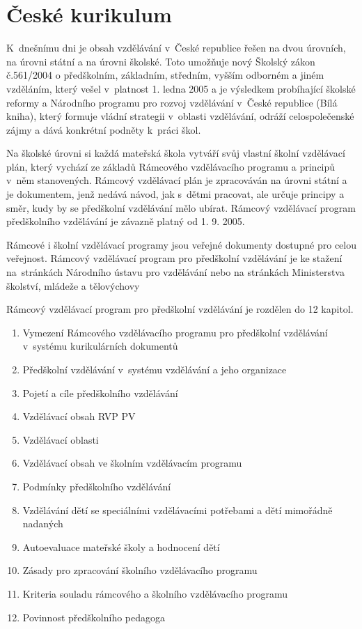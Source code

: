 	\section{České kurikulum}

		K dnešnímu dni je obsah vzdělávání v České republice řešen na dvou úrovních, na úrovni státní a na úrovni školské. Toto umožňuje nový Školský zákon č.561/2004 o předškolním, základním, středním, vyšším odborném a jiném vzděláním, který vešel v platnost 1. ledna 2005 a je výsledkem probíhající školské reformy a Národního programu pro rozvoj vzdělávání v České republice (Bílá kniha), který formuje vládní strategii v oblasti vzdělávání, odráží celospolečenské zájmy a dává konkrétní podněty k práci škol.

		Na školské úrovni si každá mateřská škola vytváří svůj vlastní školní vzdělávací plán, který vychází ze základů Rámcového vzdělávacího programu a principů v něm stanovených. Rámcový vzdělávací plán je zpracováván na úrovni státní a je dokumentem, jenž nedává návod, jak s dětmi pracovat, ale určuje principy a směr, kudy by se předškolní vzdělávání mělo ubírat. Rámcový vzdělávací program předškolního vzdělávání je závazně platný od 1. 9. 2005.

		Rámcové i školní vzdělávací programy jsou veřejné dokumenty dostupné pro celou veřejnost. Rámcový vzdělávací program pro předškolní vzdělávání je ke stažení na stránkách Národního ústavu pro vzdělávání \citep{RVP} nebo na stránkách Ministerstva školství, mládeže a tělovýchovy

		Rámcový vzdělávací program pro předškolní vzdělávání je rozdělen do 12 kapitol.
		\begin{enumerate}[1.]
		\item Vymezení Rámcového vzdělávacího programu pro předškolní vzdělávání v systému kurikulárních dokumentů
		\item Předškolní vzdělávání v systému vzdělávání a jeho organizace
		\item Pojetí a cíle předškolního vzdělávání
		\item Vzdělávací obsah RVP PV
		\item Vzdělávací oblasti
		\item Vzdělávací obsah ve školním vzdělávacím programu 
		\item Podmínky předškolního vzdělávání
		\item Vzdělávání dětí se speciálními vzdělávacími potřebami a dětí mimořádně nadaných
		\item Autoevaluace mateřské školy a hodnocení dětí
		\item Zásady pro zpracování školního vzdělávacího programu
		\item Kriteria souladu rámcového a školního vzdělávacího programu
		\item Povinnost předškolního pedagoga
		\end{enumerate}

